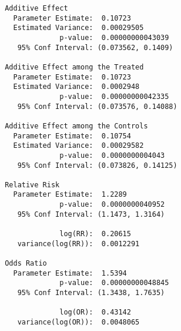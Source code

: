     
    \begin{verbatim}
 Additive Effect
   Parameter Estimate:  0.10723
   Estimated Variance:  0.00029505
              p-value:  0.00000000043039
    95% Conf Interval: (0.073562, 0.1409) 

 Additive Effect among the Treated
   Parameter Estimate:  0.10723
   Estimated Variance:  0.0002948
              p-value:  0.00000000042335
    95% Conf Interval: (0.073576, 0.14088) 

 Additive Effect among the Controls
   Parameter Estimate:  0.10754
   Estimated Variance:  0.00029582
              p-value:  0.0000000004043
    95% Conf Interval: (0.073826, 0.14125) 

 Relative Risk
   Parameter Estimate:  1.2289
              p-value:  0.0000000040952
    95% Conf Interval: (1.1473, 1.3164) 

              log(RR):  0.20615
    variance(log(RR)):  0.0012291 

 Odds Ratio
   Parameter Estimate:  1.5394
              p-value:  0.00000000048845
    95% Conf Interval: (1.3438, 1.7635) 

              log(OR):  0.43142
    variance(log(OR)):  0.0048065 
    \end{verbatim}

 